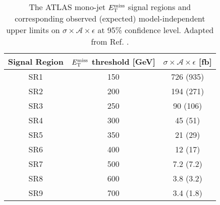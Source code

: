 \begin{table}[!htbp]
\centering
\begin{tabular}{c|c|c}
 \hline
 \hline
 Signal Region & $E_{\mathrm{T}}^{\mathrm{miss}}$ threshold [GeV] & $\sigma \times \mathcal{A} \times \epsilon$ [fb] \\ %
 \hline
 SR1 & 150 & 726 (935) \\ %
 SR2 & 200 & 194 (271) \\ %
 SR3 & 250 & 90 (106) \\ %
 SR4 & 300 & 45 (51) \\ %
 SR5 & 350 & 21 (29) \\ %
 SR6 & 400 & 12 (17) \\ %
 SR7 & 500 & 7.2 (7.2) \\ %
 SR8 & 600 & 3.8 (3.2) \\ %
 SR9 & 700 & 3.4 (1.8) \\ %
 \hline
 \hline
\end{tabular}
\caption{The ATLAS mono-jet $E_{\mathrm{T}}^{\mathrm{miss}}$ signal regions and corresponding observed (expected) model-independent upper limits on $\sigma \times \mathcal{A} \times \epsilon$ at 95\% confidence level. Adapted from Ref. \cite{Aad:2015zva}.
}
\label{monojet_SRs}
\end{table}

